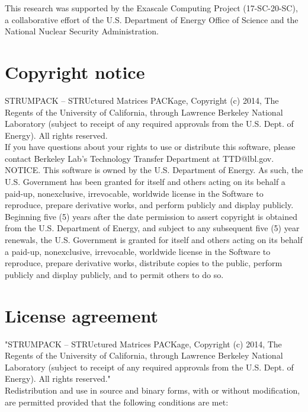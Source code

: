 \documentclass{article}
\begin{document}
This research was supported by the Exascale Computing Project
(17-SC-20-SC), a collaborative effort of the U.S. Department of Energy
Office of Science and the National Nuclear Security Administration.


\section{Copyright notice}
STRUMPACK -- STRUctured Matrices PACKage, Copyright (c) 2014, The
Regents of the University of California, through Lawrence Berkeley
National Laboratory (subject to receipt of any required approvals from
the U.S. Dept. of Energy). All rights reserved.\\

If you have questions about your rights to use or distribute this
software, please contact Berkeley Lab's Technology Transfer Department
at TTD@lbl.gov.\\

NOTICE. This software is owned by the U.S. Department of Energy. As
such, the U.S. Government has been granted for itself and others
acting on its behalf a paid-up, nonexclusive, irrevocable, worldwide
license in the Software to reproduce, prepare derivative works, and
perform publicly and display publicly. Beginning five (5) years after
the date permission to assert copyright is obtained from the
U.S. Department of Energy, and subject to any subsequent five (5) year
renewals, the U.S. Government is granted for itself and others acting
on its behalf a paid-up, nonexclusive, irrevocable, worldwide license
in the Software to reproduce, prepare derivative works, distribute
copies to the public, perform publicly and display publicly, and to
permit others to do so.

\section{License agreement}
"STRUMPACK -- STRUctured Matrices PACKage, Copyright (c) 2014, The
Regents of the University of California, through Lawrence Berkeley
National Laboratory (subject to receipt of any required approvals
from the U.S. Dept. of Energy).  All rights reserved."\\

Redistribution and use in source and binary forms, with or without
modification, are permitted provided that the following conditions
are met:
\end{document}
